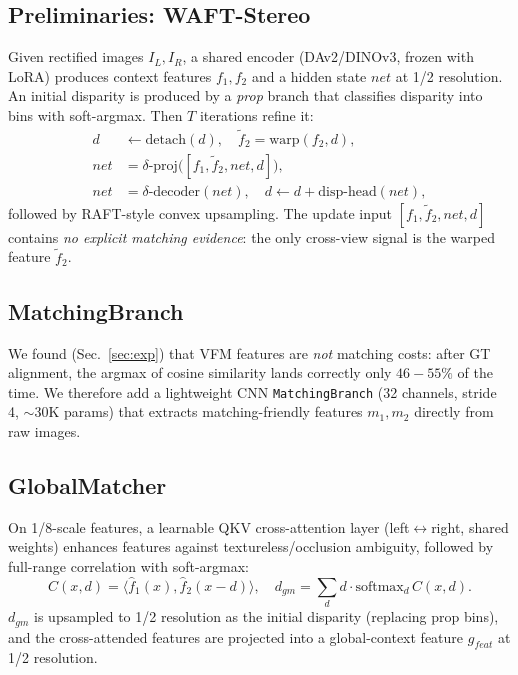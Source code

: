 \documentclass[conference]{IEEEtran}
\begin{document}
\subsection{Preliminaries: WAFT-Stereo}
Given rectified images $I_L, I_R$, a shared encoder (DAv2/DINOv3, frozen with LoRA) produces context features $f_1, f_2$ and a hidden state $net$ at 1/2 resolution. An initial disparity is produced by a \emph{prop} branch that classifies disparity into bins with soft-argmax. Then $T$ iterations refine it:
\begin{equation}
\begin{aligned}
d &\leftarrow \mathrm{detach}(d), \quad \tilde{f}_2 = \mathrm{warp}(f_2, d),\\
net &= \delta\text{-proj}\big([f_1, \tilde{f}_2, net, d]\big),\\
net &= \delta\text{-decoder}(net), \quad d \leftarrow d + \mathrm{disp\text{-}head}(net),
\end{aligned}
\label{eq:waf}
\end{equation}
followed by RAFT-style convex upsampling. The update input $[f_1, \tilde{f}_2, net, d]$ contains \emph{no explicit matching evidence}: the only cross-view signal is the warped feature $\tilde{f}_2$.

\subsection{MatchingBranch}
We found (Sec.~\ref{sec:exp}) that VFM features are \emph{not} matching costs: after GT alignment, the argmax of cosine similarity lands correctly only $46{-}55\%$ of the time. We therefore add a lightweight CNN \texttt{MatchingBranch} (32 channels, stride 4, $\sim$30K params) that extracts matching-friendly features $m_1, m_2$ directly from raw images.

\subsection{GlobalMatcher}
On 1/8-scale features, a learnable QKV cross-attention layer (left$\leftrightarrow$right, shared weights) enhances features against textureless/occlusion ambiguity, followed by full-range correlation with soft-argmax:
\begin{equation}
C(x,d)=\langle \hat{f}_1(x),\hat{f}_2(x-d)\rangle,\quad
d_{gm}=\sum_d d\cdot\mathrm{softmax}_d\,C(x,d).
\label{eq:gm}
\end{equation}
$d_{gm}$ is upsampled to 1/2 resolution as the initial disparity (replacing prop bins), and the cross-attended features are projected into a global-context feature $g_{feat}$ at 1/2 resolution.
\end{document}
